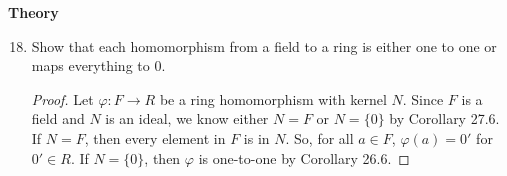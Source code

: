 \documentclass[12pt, oneside]{book}
\newcommand{\pf}[1]{
    \begin{customframedproof}[linecolor=orangehdx!75]
        \begin{proof}
        #1
        \end{proof}
    \end{customframedproof}
}
\begin{document}
\textbf{Theory}

\begin{enumerate}
    \setcounter{enumi}{17}   
    \item Show that each homomorphism from a field to a ring is either one to one or maps everything to 0.
    \pf{
        Let \(\varphi : F \to R\) be a ring homomorphism with kernel \(N\). Since \(F\) is a field and \(N\) is an ideal, we know either \(N = F\) or \(N = \{0\}\) by Corollary 27.6. If \(N = F\), then every element in \(F\) is in \(N\). So, for all \(a \in F\), \(\varphi(a) = 0'\) for \(0' \in R\). If \(N = \{0\}\), then \(\varphi\) is one-to-one by Corollary 26.6.
    }


\end{enumerate}
\end{document}
